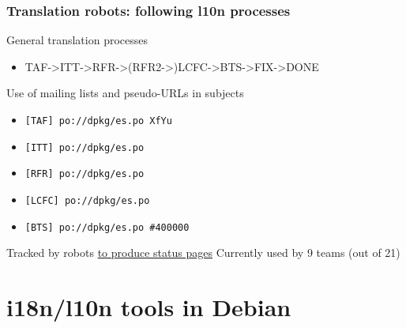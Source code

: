 \documentclass{beamer}
\begin{document}
\begin{frame}
  \frametitle{Translation robots: following l10n processes}
	\begin{block}
		{General translation processes}
		\begin{itemize}
		\item
			{TAF->ITT->RFR->(RFR2->)LCFC->BTS->FIX->DONE}
		\end{itemize}
	\end{block}
	\begin{block}
		{Use of mailing lists and pseudo-URLs in subjects}
		\begin{itemize}
		\item
			{\texttt{[TAF] po://dpkg/es.po XfYu}}
		\item
			{\texttt{[ITT] po://dpkg/es.po}}
		\item
			{\texttt{[RFR] po://dpkg/es.po}}
		\item
			{\texttt{[LCFC] po://dpkg/es.po}}
		\item
			{\texttt{[BTS] po://dpkg/es.po \#400000}}
		\end{itemize}
	\end{block}
	\begin{block}
		{Tracked by robots \href{http://http://www.debian.org.es/cgi-bin/l10n.cgi?team=es}{to produce status pages}}
		Currently used by 9 teams (out of 21)
	\end{block}
\end{frame}


\section{i18n/l10n tools in Debian}

\end{document}

